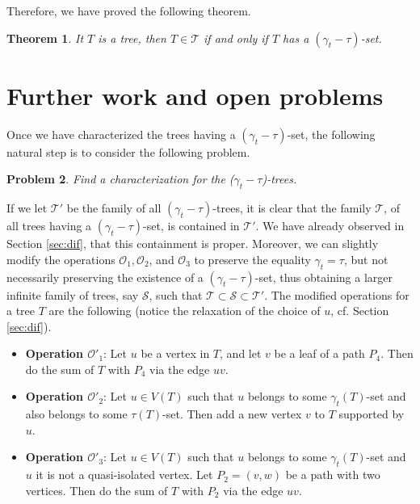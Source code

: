 \documentclass[12pt]{article}%
\newtheorem{theorem}{Theorem}
\newtheorem{problem}[theorem]{Problem}
\theoremstyle{definition}
\newcommand{\gtt}{$(\gamma_t - \tau)$}
\begin{document}
Therefore, we have proved the following theorem.

\begin{theorem} \label{main}
It $T$ is a tree, then $T \in \mathcal{T}$ if
and only if $T$ has a \gtt-set. 
\end{theorem}
\vspace{.3cm}





\section{Further work and open problems} \label{sec:gamma-tau}


Once we have characterized the trees having a
\gtt-set, the following natural step is to consider
the following problem.

\begin{problem} \label{prob:gtt}
Find a characterization for the ($\gamma_t - \tau$)-trees.
\end{problem}

If we let $\mathcal{T}'$ be the family of all \gtt-trees,
it is clear that the family $\mathcal{T}$, of all trees
having a \gtt-set, is contained in $\mathcal{T}'$.   We
have already observed in Section \ref{sec:dif}, that
this containment is proper.   Moreover, we can slightly
modify the operations $\mathcal{O}_1, \mathcal{O}_2$,
and $\mathcal{O}_3$ to preserve the equality
$\gamma_t = \tau$, but not necessarily preserving the
existence of a \gtt-set, thus obtaining a larger infinite
family of trees, say $\mathcal{S}$, such that $\mathcal{T}
\subset \mathcal{S} \subset \mathcal{T}'$.   The modified
operations for a tree $T$ are the following (notice the
relaxation of the choice of $u$, cf. Section \ref{sec:dif}).

\begin{itemize}
	\item {\bf Operation $\mathcal{O}'_1$}: Let $u$ be a vertex
		in $T$, and let $v$ be a leaf of a path $P_4$. Then do
		the sum of $T$ with $P_4$ via the edge $uv$.

	\item {\bf Operation $\mathcal{O}'_2$}:   Let $u\in V(T)$ such
		that $u$ belongs to some $\gamma_t (T)$-set and also
		belongs to some $\tau (T)$-set. Then add a new vertex
		$v$ to $T$ supported by $u$.  
	
	\item {\bf Operation $\mathcal{O}'_3$}:   Let $u\in V(T)$ such
		that $u$ belongs to some $\gamma_t (T)$-set and $u$
		it is not a quasi-isolated vertex. Let $P_2=(v,w)$ be a
		path with two vertices.  Then do the sum of $T$ with
		$P_2$ via the edge $uv$.
\end{itemize}
\end{document}
